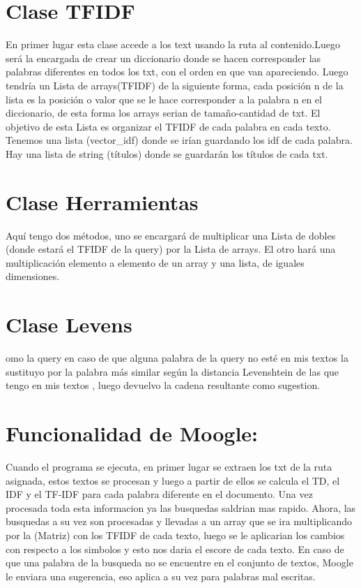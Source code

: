 \documentclass{article}
\begin{document}
\vspace{10pt}

\section*{Clase TFIDF}
En primer lugar esta clase accede a los text usando la ruta al contenido.Luego será la encargada de crear un diccionario donde se hacen corresponder las palabras diferentes en todos los txt, con el orden en que van apareciendo. Luego tendría un Lista de arrays(TFIDF) de la siguiente forma, cada posición n de la lista es la posición o valor que se le hace corresponder a la palabra n en el diccionario, de esta forma los arrays serian de tamaño-cantidad de txt. El objetivo de esta Lista es organizar el TFIDF de cada palabra en cada texto. Tenemos una lista (vector\_{}idf) donde se irían guardando los idf de cada palabra. Hay una lista de string (títulos) donde se guardarán los títulos de cada txt. 
\section*{Clase Herramientas}
Aquí tengo dos métodos, uno se encargará de multiplicar una Lista de dobles (donde estará el TFIDF de la query) por la Lista de arrays. El otro hará una multiplicación elemento a elemento de un array y una lista, de iguales dimensiones.
\section*{Clase Levens}
omo la query en caso de que alguna palabra de la query no esté en mis textos la sustituyo por la palabra más similar según la distancia Levenshtein de las que tengo en mis textos , luego devuelvo la cadena resultante como sugestion.
\section*{Funcionalidad de Moogle:}
Cuando el programa se ejecuta, en primer lugar se extraen los txt de la ruta asignada, estos textos se procesan y luego a partir de ellos se calcula el TD, el IDF y el TF-IDF para cada palabra diferente en el documento. Una vez procesada toda esta informacion ya las busquedas saldrian mas rapido. Ahora, las busquedas a su vez son procesadas y llevadas a un array que se ira multiplicando por la (Matriz) con los TFIDF de cada texto, luego se le aplicarian los cambios con respecto a los simbolos y esto nos daria el escore de cada texto. En caso de que una palabra de la busqueda no se encuentre en el conjunto de textos, Moogle le enviara una sugerencia, eso aplica a su vez para palabras mal escritas.
\end{document}
